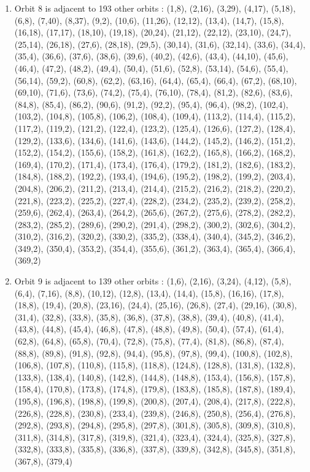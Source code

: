 \documentclass[12pt]{article}
\begin{document}
\begin{enumerate}
\item Orbit 8 is adjacent to 193 other orbits : (1,8), (2,16), (3,29), (4,17), (5,18), (6,8), (7,40), (8,37), (9,2), (10,6), (11,26), (12,12), (13,4), (14,7), (15,8), (16,18), (17,17), (18,10), (19,18), (20,24), (21,12), (22,12), (23,10), (24,7), (25,14), (26,18), (27,6), (28,18), (29,5), (30,14), (31,6), (32,14), (33,6), (34,4), (35,4), (36,6), (37,6), (38,6), (39,6), (40,2), (42,6), (43,4), (44,10), (45,6), (46,4), (47,2), (48,2), (49,4), (50,4), (51,6), (52,8), (53,14), (54,6), (55,4), (56,14), (59,2), (60,8), (62,2), (63,16), (64,4), (65,4), (66,4), (67,2), (68,10), (69,10), (71,6), (73,6), (74,2), (75,4), (76,10), (78,4), (81,2), (82,6), (83,6), (84,8), (85,4), (86,2), (90,6), (91,2), (92,2), (95,4), (96,4), (98,2), (102,4), (103,2), (104,8), (105,8), (106,2), (108,4), (109,4), (113,2), (114,4), (115,2), (117,2), (119,2), (121,2), (122,4), (123,2), (125,4), (126,6), (127,2), (128,4), (129,2), (133,6), (134,6), (141,6), (143,6), (144,2), (145,2), (146,2), (151,2), (152,2), (154,2), (155,6), (158,2), (161,8), (162,2), (165,8), (166,2), (168,2), (169,4), (170,2), (171,4), (173,4), (176,4), (179,2), (181,2), (182,6), (183,2), (184,8), (188,2), (192,2), (193,4), (194,6), (195,2), (198,2), (199,2), (203,4), (204,8), (206,2), (211,2), (213,4), (214,4), (215,2), (216,2), (218,2), (220,2), (221,8), (223,2), (225,2), (227,4), (228,2), (234,2), (235,2), (239,2), (258,2), (259,6), (262,4), (263,4), (264,2), (265,6), (267,2), (275,6), (278,2), (282,2), (283,2), (285,2), (289,6), (290,2), (291,4), (298,2), (300,2), (302,6), (304,2), (310,2), (316,2), (320,2), (330,2), (335,2), (338,4), (340,4), (345,2), (346,2), (349,2), (350,4), (353,2), (354,4), (355,6), (361,2), (363,4), (365,4), (366,4), (369,2)
\item Orbit 9 is adjacent to 139 other orbits : (1,6), (2,16), (3,24), (4,12), (5,8), (6,4), (7,16), (8,8), (10,12), (12,8), (13,4), (14,4), (15,8), (16,16), (17,8), (18,8), (19,4), (20,8), (23,16), (24,4), (25,16), (26,8), (27,4), (29,16), (30,8), (31,4), (32,8), (33,8), (35,8), (36,8), (37,8), (38,8), (39,4), (40,8), (41,4), (43,8), (44,8), (45,4), (46,8), (47,8), (48,8), (49,8), (50,4), (57,4), (61,4), (62,8), (64,8), (65,8), (70,4), (72,8), (75,8), (77,4), (81,8), (86,8), (87,4), (88,8), (89,8), (91,8), (92,8), (94,4), (95,8), (97,8), (99,4), (100,8), (102,8), (106,8), (107,8), (110,8), (115,8), (118,8), (124,8), (128,8), (131,8), (132,8), (133,8), (138,4), (140,8), (142,8), (144,8), (148,8), (153,4), (156,8), (157,8), (158,4), (170,8), (173,8), (174,8), (179,8), (183,8), (185,8), (187,8), (189,4), (195,8), (196,8), (198,8), (199,8), (200,8), (207,4), (208,4), (217,8), (222,8), (226,8), (228,8), (230,8), (233,4), (239,8), (246,8), (250,8), (256,4), (276,8), (292,8), (293,8), (294,8), (295,8), (297,8), (301,8), (305,8), (309,8), (310,8), (311,8), (314,8), (317,8), (319,8), (321,4), (323,4), (324,4), (325,8), (327,8), (332,8), (333,8), (335,8), (336,8), (337,8), (339,8), (342,8), (345,8), (351,8), (367,8), (379,4)

\end{enumerate}
\end{document}
